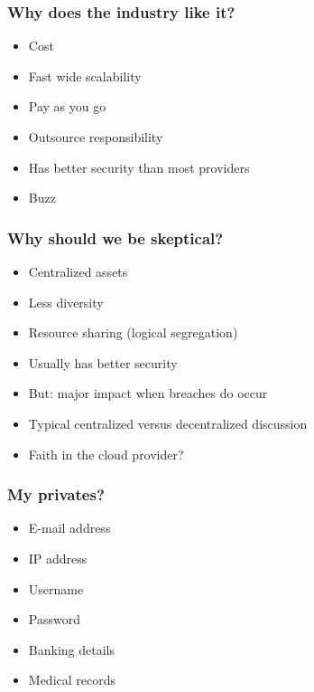 \documentclass{beamer}
\begin{document}
\begin{frame}
    \frametitle{Why does the industry like it?}
    \begin{itemize}
        \item Cost
        \item Fast wide scalability
        \item Pay as you go
        \item Outsource responsibility
        \item Has better security than most providers
        \item Buzz
    \end{itemize}
\end{frame}

\begin{frame}
    \frametitle{Why should we be skeptical?}
    \begin{itemize}
        \item Centralized assets
        \item Less diversity
        \item Resource sharing (logical segregation)
        \item Usually has better security
        \item But: major impact when breaches do occur
        \item Typical centralized versus decentralized discussion
        \item Faith in the cloud provider?
    \end{itemize}
\end{frame}

\begin{frame}
    \frametitle{My privates?}
    \begin{itemize}
      \item E-mail address
      \item IP address
      \item Username
      \item Password
      \item Banking details
      \item Medical records
    \end{itemize}
\end{frame}
\end{document}
